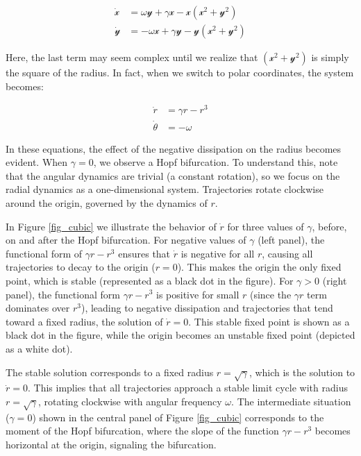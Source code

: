 \documentclass{article}
\begin{document}
\begin{subequations} \label{eq_symosc_neg_diss}
\begin{align}
    \dot{\mathscr{x}} & = \omega\mathscr{y} + \gamma\mathscr{x} - \mathscr{x}(\mathscr{x}^2 + \mathscr{y}^2) \\
    \dot{\mathscr{y}} & = -\omega\mathscr{x} + \gamma\mathscr{y} - \mathscr{y}(\mathscr{x}^2 + \mathscr{y}^2)
\end{align}
\end{subequations}

Here, the last term may seem complex until we realize that $(\mathscr{x}^2 + \mathscr{y}^2)$ is simply the square of the radius. In fact, when we switch to polar coordinates, the system becomes:

\begin{subequations} \label{eq_symosc_neg_diss_polar}
\begin{align}
    \dot{r} & = \gamma r - r^3 \\
    \dot{\theta} & = -\omega
\end{align}
\end{subequations}

In these equations, the effect of the negative dissipation on the radius becomes evident. When $\gamma = 0$, we observe a Hopf bifurcation. To understand this, note that the angular dynamics are trivial (a constant rotation), so we focus on the radial dynamics as a one-dimensional system. Trajectories rotate clockwise around the origin, governed by the dynamics of $r$.

In Figure \ref{fig_cubic} we illustrate the behavior of $\dot{r}$ for three values of $\gamma$, before, on and after the Hopf bifurcation.
For negative values of $\gamma$ (left panel), the functional form of $\gamma r - r^3$ ensures that $\dot{r}$ is negative for all $r$, causing all trajectories to decay to the origin ($r = 0$). 
This makes the origin the only fixed point, which is stable (represented as a black dot in the figure). 
For $\gamma > 0$ (right panel), the functional form $\gamma r - r^3$ is positive for small $r$ (since the $\gamma r$ term dominates over $r^3$), leading to negative dissipation and trajectories that tend toward a fixed radius, the solution of $\dot{r} = 0$. 
This stable fixed point is shown as a black dot in the figure, while the origin becomes an unstable fixed point (depicted as a white dot).

The stable solution corresponds to a fixed radius $r = \sqrt{\gamma}$, which is the solution to $\dot{r} = 0$. This implies that all trajectories approach a stable limit cycle with radius $r = \sqrt{\gamma}$, rotating clockwise with angular frequency $\omega$. The intermediate situation ($\gamma = 0$) shown in the central panel of Figure \ref{fig_cubic} corresponds to the moment of the Hopf bifurcation, where the slope of the function $\gamma r - r^3$ becomes horizontal at the origin, signaling the bifurcation.
\end{document}

